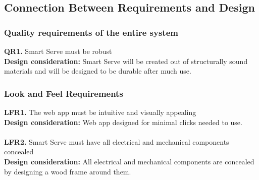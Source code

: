 \documentclass[12pt, titlepage]{article}
\begin{document}
\subsection{Connection Between Requirements and Design} \label{SecConnection}

\subsubsection{Quality requirements of the entire system}
    \noindent\textbf{QR1.} Smart Serve must be robust\\ 
    \indent\textbf{Design consideration:} Smart Serve will be created out of structurally sound materials and will be designed to be durable after much use.
\subsubsection{Look and Feel Requirements}
    \noindent\textbf{LFR1.} The web app must be intuitive and visually appealing \\
    \indent\textbf{Design consideration:} Web app designed for minimal clicks needed to use.\\\\
    \textbf{LFR2.} Smart Serve must have all electrical and mechanical components concealed \\
    \indent\textbf{Design consideration:} All electrical and mechanical components are concealed by designing a wood frame around them.
\end{document}
